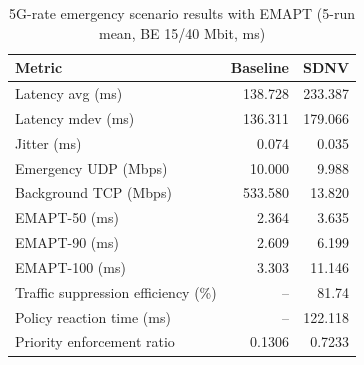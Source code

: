 \begin{table}[t]
\caption{5G-rate emergency scenario results with EMAPT (5-run mean, BE 15/40 Mbit, ms)}
\label{tab:5g-emergency-emapt}
\centering
\begin{tabular}{lrr}
\hline
Metric & Baseline & SDNV \\
\hline
Latency avg (ms) & 138.728 & 233.387 \\
Latency mdev (ms) & 136.311 & 179.066 \\
Jitter (ms) & 0.074 & 0.035 \\
Emergency UDP (Mbps) & 10.000 & 9.988 \\
Background TCP (Mbps) & 533.580 & 13.820 \\
EMAPT-50 (ms) & 2.364 & 3.635 \\
EMAPT-90 (ms) & 2.609 & 6.199 \\
EMAPT-100 (ms) & 3.303 & 11.146 \\
Traffic suppression efficiency (\%) & -- & 81.74 \\
Policy reaction time (ms) & -- & 122.118 \\
Priority enforcement ratio & 0.1306 & 0.7233 \\
\hline
\end{tabular}
\end{table}
